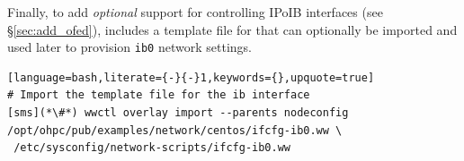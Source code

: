 
\noindent Finally, to add {\em optional} support for controlling IPoIB
interfaces (see \S\ref{sec:add_ofed}), \OHPC{} includes a
template file for \Warewulf{} that can optionally be imported and used later to provision
\texttt{ib0} network settings.

\begin{lstlisting}[language=bash,literate={-}{-}1,keywords={},upquote=true]
# Import the template file for the ib interface
[sms](*\#*) wwctl overlay import --parents nodeconfig /opt/ohpc/pub/examples/network/centos/ifcfg-ib0.ww \
 /etc/sysconfig/network-scripts/ifcfg-ib0.ww
\end{lstlisting}
